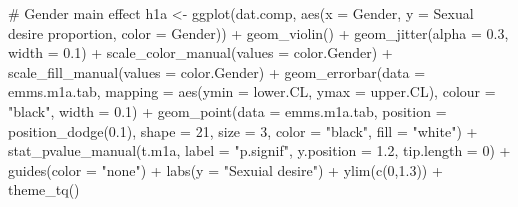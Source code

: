 \documentclass[
  bookmarksnumbered]{article}
\newenvironment{Shaded}{\begin{snugshade}}{\end{snugshade}}
\newcommand{\AttributeTok}[1]{\textcolor[rgb]{0.80,0.80,0.80}{#1}}
\newcommand{\CommentTok}[1]{\textcolor[rgb]{0.50,0.62,0.50}{#1}}
\newcommand{\DecValTok}[1]{\textcolor[rgb]{0.86,0.86,0.80}{#1}}
\newcommand{\FloatTok}[1]{\textcolor[rgb]{0.75,0.75,0.82}{#1}}
\newcommand{\FunctionTok}[1]{\textcolor[rgb]{0.94,0.94,0.56}{#1}}
\newcommand{\NormalTok}[1]{\textcolor[rgb]{0.80,0.80,0.80}{#1}}
\newcommand{\OtherTok}[1]{\textcolor[rgb]{0.94,0.94,0.56}{#1}}
\newcommand{\SpecialCharTok}[1]{\textcolor[rgb]{0.86,0.64,0.64}{#1}}
\newcommand{\StringTok}[1]{\textcolor[rgb]{0.80,0.58,0.58}{#1}}
\begin{document}
\begin{Shaded}
\begin{Highlighting}[]
\CommentTok{\# Gender main effect}
\NormalTok{h1a }\OtherTok{\textless{}{-}} \FunctionTok{ggplot}\NormalTok{(dat.comp, }\FunctionTok{aes}\NormalTok{(}\AttributeTok{x =}\NormalTok{ Gender, }\AttributeTok{y =} \StringTok{\textasciigrave{}}\AttributeTok{Sexual desire proportion}\StringTok{\textasciigrave{}}\NormalTok{, }\AttributeTok{color =}\NormalTok{ Gender)) }\SpecialCharTok{+}
  \FunctionTok{geom\_violin}\NormalTok{() }\SpecialCharTok{+}
  \FunctionTok{geom\_jitter}\NormalTok{(}\AttributeTok{alpha =} \FloatTok{0.3}\NormalTok{, }\AttributeTok{width =} \FloatTok{0.1}\NormalTok{) }\SpecialCharTok{+}
  \FunctionTok{scale\_color\_manual}\NormalTok{(}\AttributeTok{values =}\NormalTok{ color.Gender) }\SpecialCharTok{+}
  \FunctionTok{scale\_fill\_manual}\NormalTok{(}\AttributeTok{values =}\NormalTok{ color.Gender) }\SpecialCharTok{+}
  \FunctionTok{geom\_errorbar}\NormalTok{(}\AttributeTok{data =}\NormalTok{ emms.m1a.tab, }
                \AttributeTok{mapping =} \FunctionTok{aes}\NormalTok{(}\AttributeTok{ymin =}\NormalTok{ lower.CL, }\AttributeTok{ymax =}\NormalTok{ upper.CL), }
                \AttributeTok{colour =} \StringTok{"black"}\NormalTok{, }\AttributeTok{width =} \FloatTok{0.1}\NormalTok{) }\SpecialCharTok{+}
  \FunctionTok{geom\_point}\NormalTok{(}\AttributeTok{data =}\NormalTok{ emms.m1a.tab, }
             \AttributeTok{position =} \FunctionTok{position\_dodge}\NormalTok{(}\FloatTok{0.1}\NormalTok{), }
             \AttributeTok{shape =} \DecValTok{21}\NormalTok{, }\AttributeTok{size =} \DecValTok{3}\NormalTok{,}
             \AttributeTok{color =} \StringTok{"black"}\NormalTok{, }\AttributeTok{fill =} \StringTok{"white"}\NormalTok{) }\SpecialCharTok{+}
  \FunctionTok{stat\_pvalue\_manual}\NormalTok{(t.m1a, }
                     \AttributeTok{label =} \StringTok{"p.signif"}\NormalTok{, }
                     \AttributeTok{y.position =} \FloatTok{1.2}\NormalTok{, }
                     \AttributeTok{tip.length =} \DecValTok{0}\NormalTok{) }\SpecialCharTok{+}
  \FunctionTok{guides}\NormalTok{(}\AttributeTok{color =} \StringTok{"none"}\NormalTok{) }\SpecialCharTok{+}
  \FunctionTok{labs}\NormalTok{(}\AttributeTok{y =} \StringTok{"Sexuial desire"}\NormalTok{) }\SpecialCharTok{+}
  \FunctionTok{ylim}\NormalTok{(}\FunctionTok{c}\NormalTok{(}\DecValTok{0}\NormalTok{,}\FloatTok{1.3}\NormalTok{)) }\SpecialCharTok{+}
  \FunctionTok{theme\_tq}\NormalTok{()}


\end{Highlighting}
\end{Shaded}
\end{document}
